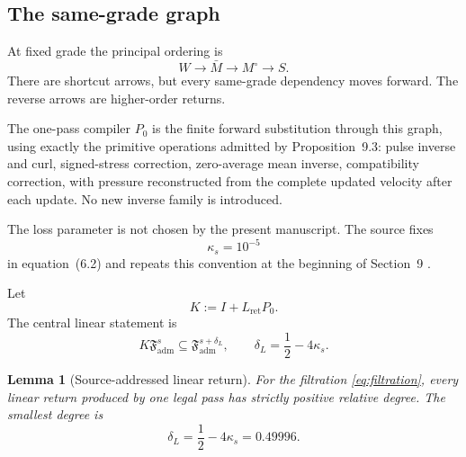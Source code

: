 \documentclass[11pt]{article}
\numberwithin{equation}{section}
\theoremstyle{highend}
\newtheorem{lemma}[theorem]{Lemma}
\theoremstyle{definition}
\newcommand{\Fadm}{\mathfrak F_{\mathrm{adm}}}
\begin{document}
\subsection{The same-grade graph}
At fixed grade the principal ordering is
\[
\boxed{W\longrightarrow \bar M\longrightarrow M^\circ\longrightarrow S.}
\]
There are shortcut arrows, but every same-grade dependency moves forward. The reverse arrows are higher-order returns.

The one-pass compiler $P_0$ is the finite forward substitution through this graph, using exactly the primitive operations admitted by Proposition~9.3: pulse inverse and curl, signed-stress correction, zero-average mean inverse, compatibility correction, with pressure reconstructed from the complete updated velocity after each update. No new inverse family is introduced.

The loss parameter is not chosen by the present manuscript. The source fixes
\[
\kappa_s=10^{-5}
\]
in equation~(6.2) and repeats this convention at the beginning of Section~9 \cite[pp.~63,100]{OpenAI2026NS}.

Let
\[
K:=I+L_{\mathrm{ret}}P_0.
\]
The central linear statement is
\begin{equation}\label{eq:linear}
K\Fadm^s\subseteq \Fadm^{s+\delta_L},
\qquad
\delta_L=\frac12-4\kappa_s.
\end{equation}

\begin{lemma}[Source-addressed linear return]\label{lem:linear-trace}
For the filtration \eqref{eq:filtration}, every linear return produced by one legal pass has strictly positive relative degree. The smallest degree is
\[
\delta_L=\frac12-4\kappa_s=0.49996.
\]
\end{lemma}
\end{document}
